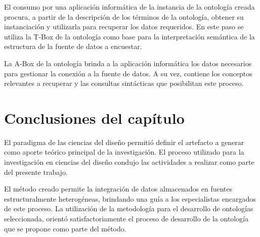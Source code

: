 El consumo por una aplicación informática de la instancia de la ontología creada procura, a partir de la descripción de los términos de la ontología, obtener su instanciación y utilizarla para recuperar los datos requeridos. En este paso se utiliza la T-Box de la ontología como base para la interpretación semántica de la estructura de la fuente de datos a encuestar.

La A-Box de la ontología brinda a la aplicación informática los datos necesarios para gestionar la conexión a la fuente de datos. A su vez, contiene los conceptos relevantes a recuperar y las consultas sintácticas que posibilitan este proceso.

\section{Conclusiones del capítulo}

El paradigma de las ciencias del diseño permitió definir el artefacto a generar como aporte teórico principal de la investigación. El proceso utilizado para la investigación en ciencias del diseño condujo las actividades a realizar como parte del presente trabajo.

El método creado permite la integración de datos almacenados en fuentes estructuralmente heterogéneas, brindando una guía a los especialistas encargados de este proceso. La utilización de la metodología para el desarrollo de ontologías seleccionada, orientó satisfactoriamente el proceso de desarrollo de la ontología que se propone como parte del método.





